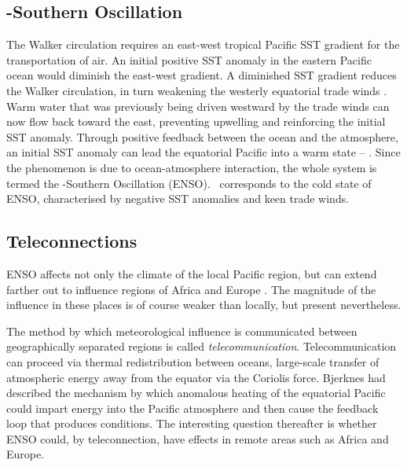 

\subsection{\elnino-Southern Oscillation}
The Walker circulation requires an east-west tropical Pacific SST gradient for
the transportation of air. An initial positive SST anomaly in the eastern
Pacific ocean would diminish the east-west gradient. A diminished SST gradient
reduces the Walker circulation, in turn weakening the westerly equatorial trade
winds \citep{lindzen1987}. Warm water that was previously being driven westward
by the trade winds can now flow back toward the east, preventing upwelling and
reinforcing the initial SST anomaly. Through positive feedback between the
ocean and the atmosphere, an initial SST anomaly can lead the equatorial Pacific
into a warm state -- \elnino. Since the phenomenon is due to ocean-atmosphere
interaction, the whole system is termed the \elnino-Southern Oscillation
(ENSO). {}\nina\ corresponds to the cold state of ENSO, characterised by
negative SST anomalies and keen trade winds.


\subsection{Teleconnections}
ENSO affects not only the climate of the local Pacific region, but can extend
farther out to influence regions of Africa and Europe \citep{moron1998}. The
magnitude of the influence in these places is of course weaker than locally, but
present nevertheless.

The method by which meteorological influence is communicated between
geographically separated regions is called
\emph{telecommunication}. Telecommunication can proceed via thermal
redistribution between oceans, large-scale transfer of atmospheric energy away
from the equator via the Coriolis force. Bjerknes had described the mechanism by
which anomalous heating of the equatorial Pacific could impart energy into the
Pacific atmosphere and then cause the feedback loop that produces \elnino{}
conditions. The interesting question thereafter is whether ENSO could, by
teleconnection, have effects in remote areas such as Africa and Europe.

